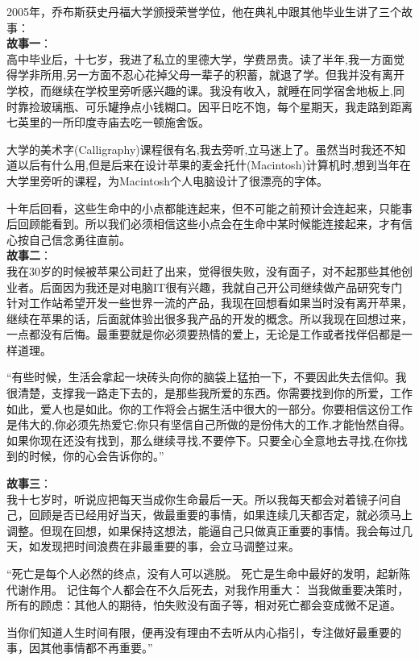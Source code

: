 2005年，乔布斯获史丹福大学颁授荣誉学位，他在典礼中跟其他毕业生讲了三个故事：\\
\textbf{故事一}：\\
高中毕业后，十七岁，我进了私立的里德大学，学费昂贵。读了半年,我一方面觉得学非所用,另一方面不忍心花掉父母一辈子的积蓄，就退了学。但我并没有离开学校，而继续在学校里旁听感兴趣的课。我没有收入，就睡在同学宿舍地板上,同时靠捡玻璃瓶、可乐罐挣点小钱糊口。因平日吃不饱，每个星期天，我走路到距离七英里的一所印度寺庙去吃一顿施舍饭。

大学的美术字(Calligraphy)课程很有名,我去旁听,立马迷上了。虽然当时我还不知道以后有什么用,但是后来在设计苹果的麦金托什(Macintosh)计算机时,想到当年在大学里旁听的课程，为Macintosh个人电脑设计了很漂亮的字体。

十年后回看，这些生命中的小点都能连起来，但不可能之前预计会连起来，只能事后回顾能看到。所以我们必须相信这些小点会在生命中某时候能连接起来，才有信心按自己信念勇往直前。\\

\textbf{故事二}：\\
我在30岁的时候被苹果公司赶了出来，觉得很失败，没有面子，对不起那些其他创业者。后面因为我还是对电脑IT很有兴趣，我就自己开公司继续做产品研究专门针对工作站希望开发一些世界一流的产品，我现在回想看如果当时没有离开苹果，继续在苹果的话，后面就体验出很多我产品的开发的概念。所以我现在回想过来，一点都没有后悔。最重要就是你必须要热情的爱上，无论是工作或者找伴侣都是一样道理。

“有些时候，生活会拿起一块砖头向你的脑袋上猛拍一下，不要因此失去信仰。我很清楚，支撑我一路走下去的，是那些我所爱的东西。你需要找到你的所爱，工作如此，爱人也是如此。你的工作将会占据生活中很大的一部分。你要相信这份工作是伟大的,你必须先热爱它;你只有坚信自己所做的是份伟大的工作,才能怡然自得。如果你现在还没有找到，那么继续寻找,不要停下。只要全心全意地去寻找,在你找到的时候，你的心会告诉你的。” 

\textbf{故事三}：\\
我十七岁时，听说应把每天当成你生命最后一天。所以我每天都会对着镜子问自己，回顾是否已经用好当天，做最重要的事情，如果连续几天都否定，就必须马上调整。但现在回想，如果保持这想法，能逼自己只做真正重要的事情。我会每过几天，如发现把时间浪费在非最重要的事，会立马调整过来。

``死亡是每个人必然的终点，没有人可以逃脱。
死亡是生命中最好的发明，起新陈代谢作用。
记住每个人都会在不久后死去，对我作用重大：
当我做重要决策时，所有的顾虑：其他人的期待，怕失败没有面子等，相对死亡都会变成微不足道。

当你们知道人生时间有限，便再没有理由不去听从内心指引，专注做好最重要的事，因其他事情都不再重要。''

